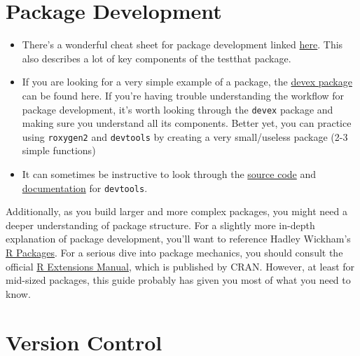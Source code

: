 \documentclass[
]{book}
\begin{document}
\hypertarget{package-development-1}{%
\section{Package Development}\label{package-development-1}}

\begin{itemize}
\item
  There's a wonderful cheat sheet for package development linked \href{https://www.rstudio.com/wp-content/uploads/2015/06/devtools-cheatsheet.pdf}{here}. This also describes a lot of key components of the testthat package.
\item
  If you are looking for a very simple example of a package, the \href{https://github.com/IQSS/Rbuild/tree/master/devex}{devex package} can be found here. If you're having trouble understanding the workflow for package development, it's worth looking through the \texttt{devex} package and making sure you understand all its components. Better yet, you can practice using \texttt{roxygen2} and \texttt{devtools} by creating a very small/useless package (2-3 simple functions)
\item
  It can sometimes be instructive to look through the \href{https://www.rdocumentation.org/packages/devtools/versions/1.13.3/source}{source code} and \href{https://www.rdocumentation.org/packages/devtools/versions/1.13.3}{documentation} for \texttt{devtools}.
\end{itemize}

Additionally, as you build larger and more complex packages, you might need a deeper understanding of package structure. For a slightly more in-depth explanation of package development, you'll want to reference Hadley Wickham's \href{http://r-pkgs.had.co.nz/}{R Packages}. For a serious dive into package mechanics, you should consult the official \href{https://cran.r-project.org/doc/manuals/R-exts.html\#Creating-R-packages}{R Extensions Manual}, which is published by CRAN. However, at least for mid-sized packages, this guide probably has given you most of what you need to know.

\hypertarget{version-control}{%
\section{Version Control}\label{version-control}}
\end{document}
